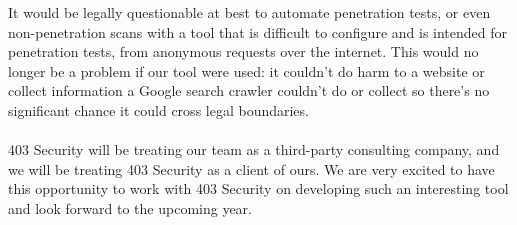  It would be legally questionable at best to automate penetration tests, or even non-penetration scans with a tool that is difficult to configure and is intended for penetration tests, from anonymous requests over the internet. This would no longer be a problem if our tool were used: it couldn’t do harm to a website or collect information a Google search crawler couldn’t do or collect so there’s no significant chance it could cross legal boundaries.\\\\
403 Security will be treating our team as a third-party consulting company, and we will be treating 403 Security as a client of ours. We are very excited to have this opportunity to work with 403 Security on developing such an interesting tool and look forward to the upcoming year.

